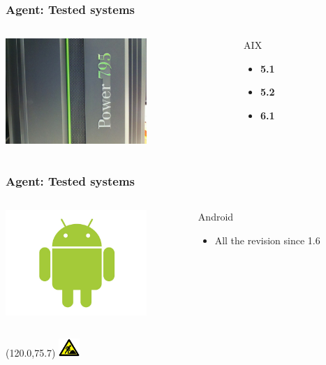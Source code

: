 \documentclass{beamer}
\newcommand{\WorkInProgress}{%
\begin{textblock}{14}(120.0,75.7)
\includegraphics[height=0.7cm]{./pics/workinprogress.jpg}
\end{textblock}
  }
\begin{document}
\begin{frame}
    \frametitle{Agent: Tested systems}

\begin{columns}
 \begin{column}[T]{4cm}
    \includegraphics[height=4.0cm]{pics/os/aix.jpg}
 \end{column}
 \begin{column}[t]{5cm}

    \begin{block}{AIX}
        \begin{itemize}
            \item \textbf{5.1}
            \item \textbf{5.2}
            \item \textbf{6.1}
        \end{itemize}
    \end{block}
 \end{column}
\end{columns}

\end{frame}

\begin{frame}
    \frametitle{Agent: Tested systems}

\begin{columns}
 \begin{column}[T]{4cm}
    \includegraphics[height=4.0cm]{pics/os/android.jpg}
 \end{column}
 \begin{column}[t]{5cm}

    \begin{block}{Android}
        \begin{itemize}
            \item All the revision since 1.6
        \end{itemize}
    \end{block}
 \end{column}
\end{columns}
\WorkInProgress
\end{frame}
\end{document}
